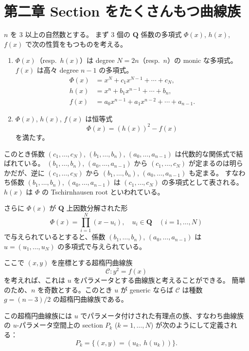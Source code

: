 \documentclass[uplatex,dvipdfmx]{jlreq}
\begin{document}
\section*{第二章 Section をたくさんもつ曲線族}

$n$ を $3$ 以上の自然数とする。
まず $3$ 個の $\mathbf{Q}$ 係数の多項式 $\Phi(x)$, $h(x)$, $f(x)$ で次の性質をもつものを考える。
\begin{enumerate}
  \item $\Phi(x)$（resp.\ $h(x)$）は degree $N = 2n$（resp.\ $n$）の monic な多項式。$f(x)$ は高々 degree $n-1$ の多項式。
        \begin{align*}
          \Phi(x) & = x^{N} + c_1 x^{N-1} + \cdots + c_N, \\
          h(x)    & = x^n + b_1 x^{n-1} + \cdots + b_n,   \\
          f(x)    & = a_0 x^{n-1} + a_1 x^{n-2} + \cdots + a_{n-1}.
        \end{align*}
  \item $\Phi(x)$, $h(x)$, $f(x)$ は恒等式
        \[
          \Phi(x) = (h(x))^2 - f(x)
        \]
        を満たす。
\end{enumerate}

このとき係数 $(c_1, \dots, c_N)$, $(b_1, \dots, b_n)$, $(a_0, \dots, a_{n-1})$ は代数的な関係式で結ばれている。
$(b_1, \dots, b_n)$, $(a_0, \dots, a_{n-1})$ から $(c_1, \dots, c_N)$ が定まるのは明らかだが、逆に $(c_1, \dots, c_N)$ から $(b_1, \dots, b_n)$, $(a_0, \dots, a_{n-1})$ も定まる。
すなわち係数 $(b_1, \dots, b_n)$, $(a_0, \dots, a_{n-1})$ は $(c_1, \dots, c_N)$ の多項式として表される。
$h(x)$ は $\Phi$ の Tschirnhausen root といわれている。

さらに $\Phi(x)$ が $\mathbf{Q}$ 上因数分解された形
\[
  \Phi(x) = \prod_{i=1}^{N}(x - u_i), \quad u_i \in \mathbf{Q} \quad (i = 1, \dots, N)
\]
で与えられているとすると、係数 $(b_1, \dots, b_n)$, $(a_0, \dots, a_{n-1})$ は $u = (u_1, \dots, u_N)$ の多項式で与えられている。

ここで $(x, y)$ を座標とする超楕円曲線族
\[
  \mathcal{C} : y^2 = f(x)
\]
を考えれば、これは $u$ をパラメータとする曲線族と考えることができる。
簡単のため、$n$ を奇数とする。このとき $u$ が generic ならば $\mathcal{C}$ は種数 $g = (n-3)/2$ の超楕円曲線族である。

この超楕円曲線族には $u$ でパラメータ付けされた有理点の族、すなわち曲線族の $u$-パラメータ空間上の section $P_k$ ($k = 1, \dots, N$) が次のようにして定義される：
\[
  P_k = \{(x, y) = (u_k,\ h(u_k))\}.
\]
\end{document}
